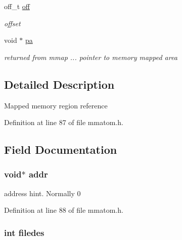 \begin{DoxyCompactItemize}
off\-\_\-t \hyperlink{struct_m_m_a___m_e_m_m_a_p___r_e_f_ae55cdc1a5c5d6998036cdc48050636a9}{off}
\begin{DoxyCompactList}\small\item\em offset \end{DoxyCompactList}\item 
void $\ast$ \hyperlink{struct_m_m_a___m_e_m_m_a_p___r_e_f_ae642ac0c16c7fa1c32b7612e9734db81}{pa}
\begin{DoxyCompactList}\small\item\em returned from mmap ... pointer to memory mapped area \end{DoxyCompactList}\end{DoxyCompactItemize}


\subsection{Detailed Description}
Mapped memory region reference 

Definition at line 87 of file mmatom.\-h.



\subsection{Field Documentation}
\hypertarget{struct_m_m_a___m_e_m_m_a_p___r_e_f_ae5bd6c22dbf0f6b5b0ae0233f8eb3704}{
\subsubsection[{addr}]{\setlength{\rightskip}{0pt plus 5cm}void$\ast$ addr}}\label{struct_m_m_a___m_e_m_m_a_p___r_e_f_ae5bd6c22dbf0f6b5b0ae0233f8eb3704}


address hint. Normally 0 



Definition at line 88 of file mmatom.\-h.

\hypertarget{struct_m_m_a___m_e_m_m_a_p___r_e_f_ac657804269d18c2152f07bc54c20874d}{
\subsubsection[{filedes}]{\setlength{\rightskip}{0pt plus 5cm}int filedes}}\label{struct_m_m_a___m_e_m_m_a_p___r_e_f_ac657804269d18c2152f07bc54c20874d}


